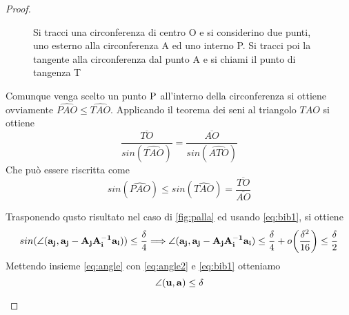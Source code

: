 \documentclass[a4paper,11pt,openright,twoside	]{book}
\begin{document}
\begin{proof}
\begin{itemize}
\begin{figure}[h!]
\centering
{}
\caption{Si tracci una circonferenza di centro O e si considerino due punti, uno esterno alla circonferenza A ed uno interno P. Si tracci poi la tangente alla circonferenza dal punto A e si chiami il punto di tangenza T}
\label{fig:triangolo3}
\end{figure}


Comunque venga scelto un punto $ \rm P$ all'interno della circonferenza si ottiene ovviamente $ \widehat{PAO} \leq \widehat{TAO} $. 
Applicando il teorema dei seni al triangolo $TAO$  si ottiene
\[ \frac{\overline{TO}}{sin( \widehat{TAO}) } = \frac{\overline{AO}}{sin( \widehat{ATO}) } \]
Che può essere riscritta come 
\begin{equation}
\label{eq:seni}
sin(\widehat{PAO}) \leq sin( \widehat{TAO})= \frac{\overline{TO}}{\overline{AO}}
\end{equation}

Trasponendo qusto risultato nel caso di \ref{fig:palla} ed usando \ref{eq:bib1}, si ottiene 
\begin{equation}
\label{eq:angle2}
sin(\angle(\vb{a_j}, \vb{a_j- A_j A_i^{-1} a_i} ) ) \leq \frac{\delta}{4} \Longrightarrow \angle(\vb{a_j}, \vb{a_j- A_j A_i^{-1} a_i} ) \leq \frac{\delta}{4} + o \bigg( \frac{\delta^2}{16} \bigg) \leq \frac{\delta}{2}
\end{equation}
Mettendo insieme \ref{eq:angle} con \ref{eq:angle2} e \ref{eq:bib1} otteniamo
\[ \angle (\vb{u, a}) \leq \delta \]
\end{itemize}


\end{proof}
\end{document}
